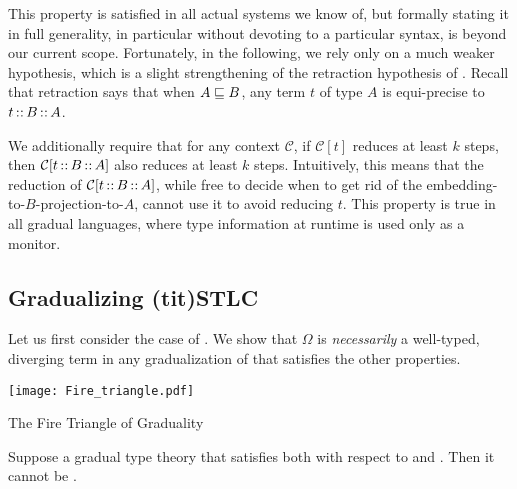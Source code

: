 This property is satisfied in all actual systems we know of,
but formally stating it in full generality, in particular without devoting
to a particular syntax, is beyond our current scope.
Fortunately, in the following, we rely only on a much weaker hypothesis,
which is a slight strengthening of the retraction hypothesis of .
Recall that retraction says that when $A \sqsubseteq B$, any term $t$ of type $A$
is equi-precise to $t \operatorname{:\hspace{-1.5pt}:} B \operatorname{:\hspace{-1.5pt}:} A$.

We additionally require that for any context $\mathcal{C}$, if $\mathcal{C}[t]$
reduces at least $k$ steps, then $\mathcal{C}[t \operatorname{:\hspace{-1.5pt}:} B \operatorname{:\hspace{-1.5pt}:} A]$ also reduces at
least $k$ steps.
Intuitively, this means that the reduction of $\mathcal{C}[t \operatorname{:\hspace{-1.5pt}:} B \operatorname{:\hspace{-1.5pt}:} A]$,
while free to decide when to get rid of the embedding-to-$B$-projection-to-$A$,
cannot use it to avoid reducing $t$.
This property is true in all gradual languages,
where type information at runtime is used only as a monitor.

\subsection{Gradualizing \kl(tit){STLC}}
Let us first consider the case of .
We show that $\Omega$ is \emph{necessarily} a well-typed, diverging term in any
gradualization of  that satisfies the other properties.

\begin{marginfigure}
  \texttt{[image: Fire\_triangle.pdf]}
  \caption{The Fire Triangle of Graduality}
\end{marginfigure}

\begin{theorem}
  \label{thm:triangle-STLC}

Suppose a gradual type theory that satisfies both  with respect to
 and . Then it cannot be .

\end{theorem}


